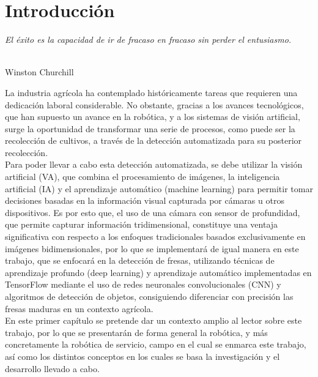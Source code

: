 \chapter{Introducción}
\label{cap:capitulo1}
\setcounter{page}{1}

\begin{flushright}
\begin{minipage}[]{10cm}
\emph{El éxito es la capacidad de ir de fracaso en fracaso sin perder el entusiasmo.}\\
\end{minipage}\\

Winston Churchill\\
\end{flushright}

\vspace{1cm}

La industria agrícola ha contemplado históricamente tareas que requieren una dedicación laboral considerable. No obstante, gracias a los avances tecnológicos, que han supuesto un avance en la robótica, y a los sistemas de visión artificial, surge la oportunidad de transformar una serie de procesos, como puede ser la recolección de cultivos, a través de la detección automatizada para su posterior recolección.\\

Para poder llevar a cabo esta detección automatizada, se debe utilizar la visión artificial (VA), que combina el procesamiento de imágenes, la inteligencia artificial (IA) y el aprendizaje automático (machine learning) para permitir tomar decisiones basadas en la información visual capturada por cámaras u otros dispositivos. Es por esto que, el uso de una cámara con sensor de profundidad, que permite capturar información tridimensional, constituye una ventaja significativa con respecto a los enfoques tradicionales basados exclusivamente en imágenes bidimensionales, por lo que se implementará de igual manera en este trabajo, que se enfocará en la detección de fresas, utilizando técnicas de aprendizaje profundo (deep learning) y aprendizaje automático implementadas en TensorFlow mediante el uso de redes neuronales convolucionales (CNN) y algoritmos de detección de objetos, consiguiendo diferenciar con precisión las fresas maduras en un contexto agrícola.\\

En este primer capítulo se pretende dar un contexto amplio al lector sobre este trabajo, por lo que se presentarán de forma general la robótica, y más concretamente la robótica de servicio, campo en el cual se enmarca este trabajo, así como los distintos conceptos en los cuales se basa la investigación y el desarrollo llevado a cabo. \\

